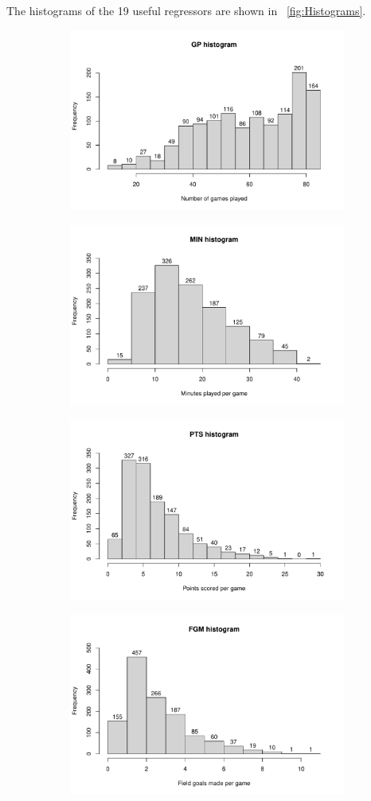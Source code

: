 The histograms of the 19 useful regressors are shown in \Fig~\ref{fig:Histograms}.
\begin{figure}[H]
	\centering
	\begin{subfigure}{.3\textwidth}
		\centering
		\includegraphics[width=0.5\linewidth]{ImageFiles/Histograms/histogram_gp.pdf}
		\caption{}
		\label{fig:HistGP}
	\end{subfigure}%
	\begin{subfigure}{.3\textwidth}
		\centering
		\includegraphics[width=0.5\linewidth]{ImageFiles/Histograms/histogram_min.pdf}
		\caption{}
		\label{fig:HistMIN}
	\end{subfigure}%
	\begin{subfigure}{.3\textwidth}
		\centering
		\includegraphics[width=0.5\linewidth]{ImageFiles/Histograms/histogram_pts.pdf}
		\caption{}
		\label{fig:HistPTS}
	\end{subfigure}
	\begin{subfigure}{.3\textwidth}
		\centering
		\includegraphics[width=0.5\linewidth]{ImageFiles/Histograms/histogram_fgm.pdf}

\end{subfigure}
\end{figure}
